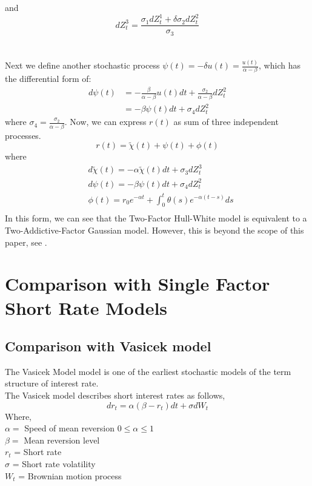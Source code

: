\documentclass{article}
\begin{document}
and 
\[
dZ_{t}^{3} = \frac{\sigma_{1}dZ_{t}^{1} + \delta\sigma_{2}dZ_{t}^{2}}{\sigma_{3}} 
\] \\
\\
Next we define another stochastic process $\psi(t) = -\delta u(t) = \frac{u(t)}{\alpha - \beta}$,
which has the differential form of:
\begin{align*}
d\psi(t) &= -\frac{\beta}{\alpha - \beta}u(t)dt + \frac{\sigma_{2}}{\alpha - \beta}dZ_{t}^{2} \\
&= -\beta\psi(t)dt + \sigma_{4}dZ_{t}^{2}
\end{align*}
where $\sigma_{4} = \frac{\sigma_{2}}{\alpha - \beta}$. Now, we can express $r(t)$ as sum of three independent processes.
\[
r(t) = \tilde{\chi}(t) + \psi(t) + \phi(t)  
\]
where
\begin{align*}
&d\tilde{\chi}(t) = -\alpha\tilde{\chi}(t)dt + \sigma_{3}dZ_{t}^{3} \\
&d\psi(t) = -\beta\psi(t)dt + \sigma_{4}dZ_{t}^{2} \\
&\phi(t) = r_{0}e^{-\alpha t} + \int_{0}^{t}{\theta(s)e^{-\alpha(t-s)}ds} \\
\end{align*}
In this form, we can see that the Two-Factor Hull-White model is equivalent to a Two-Addictive-Factor Gaussian model.
However, this is beyond the scope of this paper, see \cite{BA1}.
\section{Comparison with Single Factor Short Rate Models
}

\subsection{Comparison with Vasicek model
}
The Vasicek Model \cite{Vas1} model is one of the earliest stochastic models of the term structure of interest rate.\\

The Vasicek model describes short interest rates as follows,
 \[
dr_t = \alpha(\beta - r_t) dt + \sigma dW_t
\]
Where,\\
$\alpha =$ Speed of mean reversion $0 \leq \alpha \leq 1 $ \\
$\beta =$ Mean reversion level  \\
$r_t$ = Short rate  \\
$\sigma$ = Short rate volatility \\
$W_t$ = Brownian motion process  \\
\end{document}
